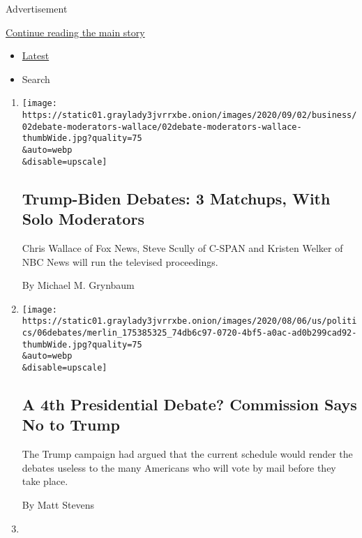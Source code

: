 Advertisement

\protect\hyperlink{after-mid1}{Continue reading the main story}

\begin{itemize}
\tightlist
\item
  \protect\hyperlink{stream-panel}{Latest}
\item
  Search
\end{itemize}

\begin{enumerate}
\def\labelenumi{\arabic{enumi}.}
\item
  \href{/2020/09/02/business/media/trump-biden-debate-moderators.html}{}

  \texttt{[image: https://static01.graylady3jvrrxbe.onion/images/2020/09/02/business/02debate-moderators-wallace/02debate-moderators-wallace-thumbWide.jpg?quality=75\\\&auto=webp\\\&disable=upscale]}

  \hypertarget{trump-biden-debates-3-matchups-with-solo-moderators}{%
  \subsection{Trump-Biden Debates: 3 Matchups, With Solo
  Moderators}\label{trump-biden-debates-3-matchups-with-solo-moderators}}

  Chris Wallace of Fox News, Steve Scully of C-SPAN and Kristen Welker
  of NBC News will run the televised proceedings.

  By Michael M. Grynbaum
\item
  \href{/2020/08/06/us/politics/presidential-debates-trump-biden.html}{}

  \texttt{[image: https://static01.graylady3jvrrxbe.onion/images/2020/08/06/us/politics/06debates/merlin\_175385325\_74db6c97-0720-4bf5-a0ac-ad0b299cad92-thumbWide.jpg?quality=75\\\&auto=webp\\\&disable=upscale]}

  \hypertarget{a-4th-presidential-debate-commission-says-no-to-trump}{%
  \subsection{A 4th Presidential Debate? Commission Says No to
  Trump}\label{a-4th-presidential-debate-commission-says-no-to-trump}}

  The Trump campaign had argued that the current schedule would render
  the debates useless to the many Americans who will vote by mail before
  they take place.

  By Matt Stevens
\item
  \href{/2020/06/22/us/politics/trump-vs-biden-presidential-debates.html}{}


\end{enumerate}
